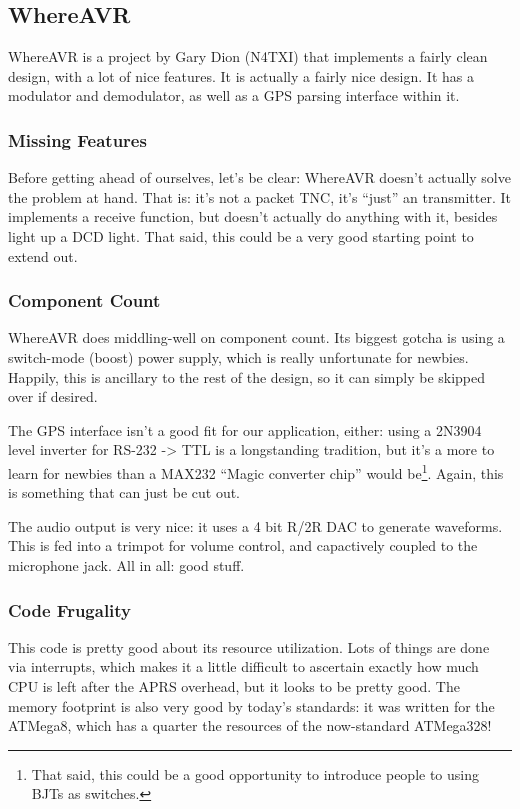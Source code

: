 \documentclass{article}
\begin{document}
\subsection{WhereAVR}

WhereAVR\cite{WhereAVR} is a project by Gary Dion (N4TXI) that
implements a fairly clean design, with a lot of nice features.  It is
actually a fairly nice design.  It has a modulator and demodulator, as
well as a GPS parsing interface within it.  

\subsubsection{Missing Features}

Before getting ahead of ourselves, let's be clear: WhereAVR doesn't
actually solve the problem at hand.  That is: it's not a packet TNC,
it's ``just'' an \aprs transmitter.  It implements a receive function,
but doesn't actually do anything with it, besides light up a DCD
light.  That said, this could be a very good starting point to extend
out.

\subsubsection{Component Count}

WhereAVR does middling-well on component count.  Its biggest gotcha is
using a switch-mode (boost) power supply, which is really unfortunate
for newbies.  Happily, this is ancillary to the rest of the design, so
it can simply be skipped over if desired.

The GPS interface isn't a good fit for our application, either: using
a 2N3904 level inverter for RS-232 -> TTL is a longstanding tradition,
but it's a more to learn for newbies than a MAX232 ``Magic converter
chip'' would be\footnote{That said, this could be a good opportunity
  to introduce people to using BJTs as switches.}.   Again, this is
something that can just be cut out.

The audio output is very nice: it uses a 4 bit R/2R DAC to generate
waveforms.  This is fed into a trimpot for volume control, and
capactively coupled to the microphone jack.  All in all: good stuff.

\subsubsection{Code Frugality}

This code is pretty good about its resource utilization.  Lots of
things are done via interrupts, which makes it a little difficult to
ascertain exactly how much CPU is left after the APRS overhead, but it
looks to be pretty good.  The memory footprint is also very good by
today's standards: it was written for the ATMega8, which has a quarter
the resources of the now-standard ATMega328!
\end{document}
